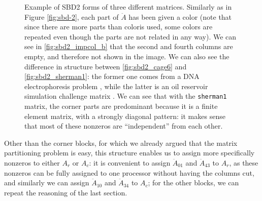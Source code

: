 \begin{figure}[h]
	\caption{Example of SBD2 forms of three different matrices. Similarly as in Figure \ref{fig:sbd-2}, each part of $\ddot{A}$ has been given a color (note that since there are more parts than coloris used, some colors are repeated even though the parts are not related in any way).	We can see in \ref{fig:sbd2_impcol_b} that the second and fourth columns are empty, and therefore not shown in the image. We can also see the difference in structure between \ref{fig:sbd2_cage6} and \ref{fig:sbd2_sherman1}: the former one comes from a DNA electrophoresis problem \cite{ufl}, while the latter is an oil reservoir simulation challenge matrix \cite{matrixmarket}. We can see that with the \texttt{sherman1} matrix, the corner parts are predominant because it is a finite element matrix, with a strongly diagonal pattern: it makes sense that most of these nonzeros are ``independent'' from each other. }  \label{fig:sbd2-2}
\end{figure}

Other than the corner blocks, for which we already argued that the matrix partitioning problem is easy, this structure enables us to assign more specifically nonzeros to either $A_r$ or $A_c$: it is convenient to assign $\ddot{A}_{01}$ and $\ddot{A}_{43}$ to $A_r$, as these nonzeros can be fully assigned to one processor without having the columns cut, and similarly we can assign $\ddot{A}_{10}$ and $\ddot{A}_{34}$ to $A_c$; for the other blocks, we can repeat the reasoning of the last section.

